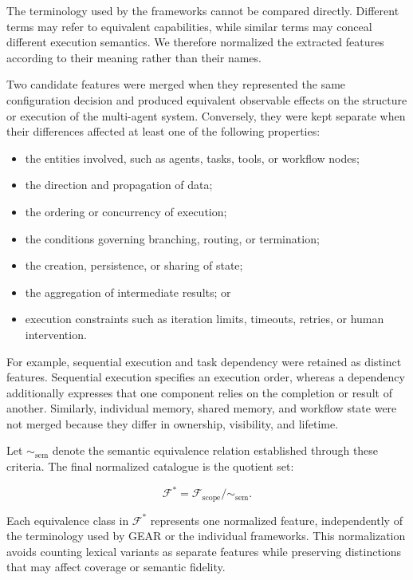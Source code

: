 The terminology used by the frameworks cannot be compared directly. Different
terms may refer to equivalent capabilities, while similar terms may conceal
different execution semantics. We therefore normalized the extracted features
according to their meaning rather than their names.

Two candidate features were merged when they represented the same
configuration decision and produced equivalent observable effects on the
structure or execution of the multi-agent system. Conversely, they were kept
separate when their differences affected at least one of the following
properties:

\begin{itemize}
    \item the entities involved, such as agents, tasks, tools, or workflow
    nodes;
    \item the direction and propagation of data;
    \item the ordering or concurrency of execution;
    \item the conditions governing branching, routing, or termination;
    \item the creation, persistence, or sharing of state;
    \item the aggregation of intermediate results; or
    \item execution constraints such as iteration limits, timeouts, retries,
    or human intervention.
\end{itemize}

For example, sequential execution and task dependency were retained as
distinct features. Sequential execution specifies an execution order, whereas
a dependency additionally expresses that one component relies on the
completion or result of another. Similarly, individual memory, shared memory,
and workflow state were not merged because they differ in ownership,
visibility, and lifetime.

Let $\sim_{\mathrm{sem}}$ denote the semantic equivalence relation established
through these criteria. The final normalized catalogue is the quotient set:

\begin{equation}
    \mathcal{F}^{*}
    =
    \mathcal{F}_{\mathrm{scope}}
    \big/
    {\sim_{\mathrm{sem}}}.
    \label{eq:normalized-feature-catalogue}
\end{equation}

Each equivalence class in $\mathcal{F}^{*}$ represents one normalized feature,
independently of the terminology used by GEAR or the individual frameworks.
This normalization avoids counting lexical variants as separate features
while preserving distinctions that may affect coverage or semantic fidelity.

